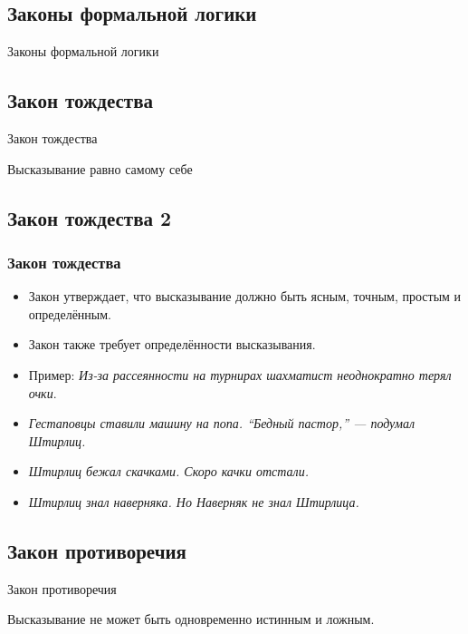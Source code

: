 \documentclass[compress,red]{beamer}
\begin{document}
\subsection{Законы формальной логики}
\begin{frame}
  \begin{center}
    \Huge{Законы формальной логики}
  \end{center}
\end{frame}

\subsection{Закон тождества}
\begin{frame}
  \begin{center}
    \Huge{Закон тождества}
  \end{center}
  \begin{center}
    \Large{Высказывание равно самому себе}
  \end{center}
\end{frame}

\subsection{Закон тождества 2}
\begin{frame}[fragile]
  \frametitle{Закон тождества}
  \begin{itemize}
    \item Закон утверждает, что высказывание должно быть ясным, точным, простым и определённым.
    \item Закон также требует определённости высказывания.
    \item Пример: \emph{Из-за рассеянности на турнирах шахматист неоднократно терял очки}.
    \item \emph{Гестаповцы ставили машину на попа. ``Бедный пастор,'' --- подумал
    Штирлиц.}
    \item \emph{Штирлиц бежал скачками. Скоро качки отстали.}
    \item \emph{Штирлиц знал наверняка. Но Наверняк не знал Штирлица.}
  \end{itemize}
\end{frame}

\subsection{Закон противоречия}
\begin{frame}
  \begin{center}
    \Huge{Закон противоречия}
  \end{center}
  \begin{center}
    \Large{Высказывание не может быть одновременно истинным и ложным.}
  \end{center}
\end{frame}
\end{document}

